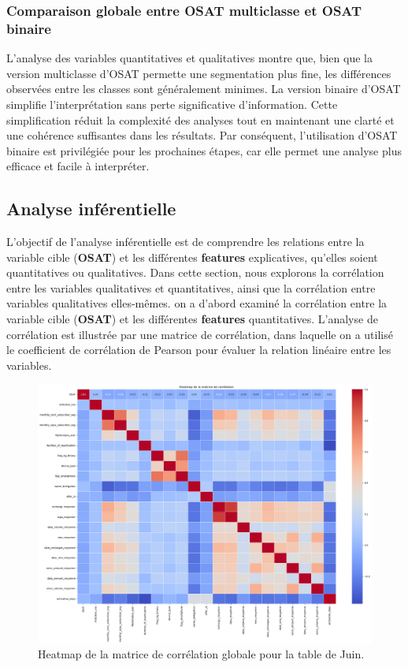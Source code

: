\subsubsection{Comparaison globale entre OSAT multiclasse et OSAT binaire}
L'analyse des variables quantitatives et qualitatives montre que, bien que la version multiclasse d'OSAT permette une segmentation plus fine, les différences observées entre les classes sont généralement minimes. La version binaire d'OSAT simplifie l'interprétation sans perte significative d'information. Cette simplification réduit la complexité des analyses tout en maintenant une clarté et une cohérence suffisantes dans les résultats. Par conséquent, l'utilisation d'OSAT binaire est privilégiée pour les prochaines étapes, car elle permet une analyse plus efficace et facile à interpréter.


\subsection{Analyse inférentielle}

L'objectif de l'analyse inférentielle est de comprendre les relations entre la variable cible (\textbf{OSAT}) et les différentes \textbf{features} explicatives, qu'elles soient quantitatives ou qualitatives. Dans cette section, nous explorons la corrélation entre les variables qualitatives et quantitatives, ainsi que la corrélation entre variables qualitatives elles-mêmes.
on a d'abord examiné la corrélation entre la variable cible (\textbf{OSAT}) et les différentes \textbf{features} quantitatives. L'analyse de corrélation est illustrée par une matrice de corrélation, dans laquelle on a utilisé le coefficient de corrélation de Pearson pour évaluer la relation linéaire entre les variables.
\begin{figure}[H]
    \centering
    \includegraphics[width=0.7\linewidth]{Correlation_Retail.png}
    \caption{Heatmap de la matrice de corrélation globale pour la table de Juin.}
    \label{fig:correlation_matrix}
\end{figure}

